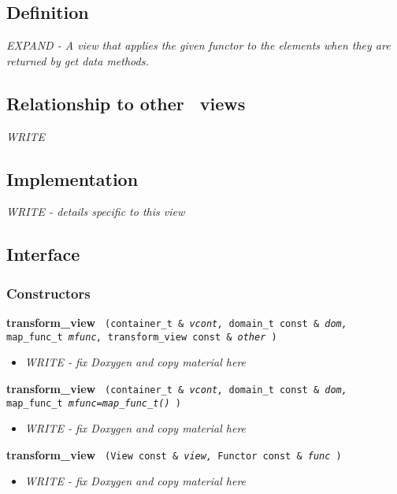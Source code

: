\subsection{Definition}

\textit{EXPAND - A view that applies the given functor to the elements when they are returned by get data methods.}

\subsection{Relationship to other \stapl\ views}

\textit{WRITE}

\subsection{Implementation}

\textit{WRITE - details specific to this view}

\subsection{Interface} \label{sec-trans-vw-inter}

\subsubsection{Constructors}

\noindent
\textbf{transform\_view}%
\texttt{%
(container\_t \&
\textit{vcont,}%
domain\_t const \&
\textit{dom,}%
map\_func\_t
\textit{mfunc,}%
transform\_view const \&
\textit{other}%
)
}

\begin{itemize}
\item
\textit{WRITE - fix Doxygen  and copy material here}
\end{itemize}

\noindent
\textbf{transform\_view}%
\texttt{%
(container\_t \&
\textit{vcont,}%
domain\_t const \&
\textit{dom,}%
map\_func\_t
\textit{mfunc=map\_func\_t()}%
)
}

\begin{itemize}
\item
\textit{WRITE - fix Doxygen and copy material here}
\end{itemize}

\noindent
\textbf{transform\_view}%
\texttt{%
(View const \&
\textit{view,}%
Functor const \&
\textit{func}%
)
}

\begin{itemize}
\item
\textit{WRITE - fix Doxygen  and copy material here}
\end{itemize}

